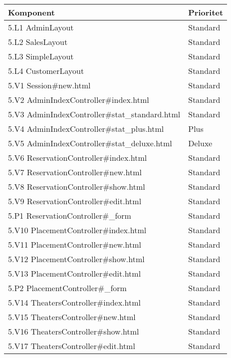 \documentclass[a4paper, twoside, 11pt, titlepage]{article}
\begin{document}
		\begin {table} [ht] \begin{tabular} {  p{3.5cm} p{9.6cm} }
			\hline
			 Komponent  &  Prioritet   \\
			\hline
			 5.L1 AdminLayout  &  Standard   \\
			\hline
			 5.L2 SalesLayout  &  Standard   \\
			\hline
			 5.L3 SimpleLayout  &  Standard   \\
			\hline
			 5.L4 CustomerLayout  &  Standard   \\
			\hline
			 5.V1 Session\#new.html  &  Standard   \\
			\hline
			 5.V2 AdminIndexController\#index.html  &  Standard   \\
			\hline
			 5.V3 AdminIndexController\#stat\_standard.html  &  Standard   \\
			\hline
			 5.V4 AdminIndexController\#stat\_plus.html  &  Plus   \\
			\hline
			 5.V5 AdminIndexController\#stat\_deluxe.html  &  Deluxe   \\
			\hline
			 5.V6 ReservationController\#index.html  &  Standard   \\
			\hline
			 5.V7 ReservationController\#new.html  &  Standard   \\
			\hline
			 5.V8 ReservationController\#show.html  &  Standard   \\
			\hline
			 5.V9 ReservationController\#edit.html  &  Standard   \\
			\hline
			 5.P1 ReservationController\#\_form  &  Standard   \\
			\hline
			 5.V10 PlacementController\#index.html  &  Standard   \\
			\hline
			 5.V11 PlacementController\#new.html  &  Standard   \\
			\hline
			 5.V12 PlacementController\#show.html  &  Standard   \\
			\hline
			 5.V13 PlacementController\#edit.html  &  Standard   \\
			\hline
			 5.P2 PlacementController\#\_form  &  Standard   \\
			\hline
			 5.V14 TheatersController\#index.html  &  Standard   \\
			\hline
			 5.V15 TheatersController\#new.html  &  Standard   \\
			\hline
			 5.V16 TheatersController\#show.html  &  Standard   \\
			\hline
			 5.V17 TheatersController\#edit.html  &  Standard   \\

\end{tabular}
\end{table}
\end{document}
